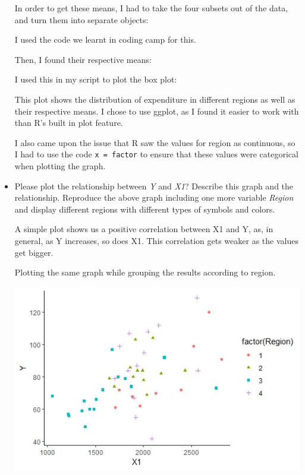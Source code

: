 \documentclass[12pt,letterpaper]{article}
\begin{document}
\begin{itemize}
In order to get these means, I had to take the four subsets out of the data, and turn them into separate objects:

I used the code we learnt in coding camp for this.

Then, I found their respective means:


I used this in my script to plot the box plot:


This plot shows the distribution of expenditure in different regions as well as their respective means. I chose to use ggplot, as I found it easier to work with than R's built in plot feature.

I also came upon the issue that R saw the values for region as continuous, so I had to use the code \texttt{x = factor} to ensure that these values were categorical when plotting the graph.

\vspace{.5cm}
\item
Please plot the relationship between \emph{Y} and \emph{X1}? Describe this graph and the relationship. Reproduce the above graph including one more variable \emph{Region} and display different regions with different types of symbols and colors.

A simple plot shows us a positive correlation between X1 and Y, as, in general, as Y increases, so does X1. This correlation gets weaker as the values get bigger.



Plotting the same graph while grouping the results according to region.

 

\includegraphics{YandX1byRegion}

\end{itemize}
\end{document}
